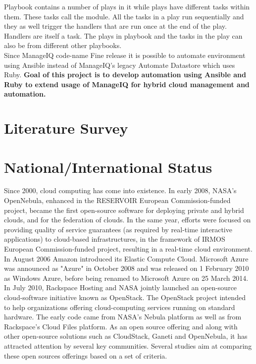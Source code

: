 \documentclass[a4paper,12pt]{report}
\begin{document}
Playbook contains a number of plays in it while plays have different tasks within them. These tasks call the module. All the tasks in a play run sequentially and they as well trigger the handlers that are run once at the end of the play. Handlers are itself a task. The plays in playbook and the tasks in the play can also be from different other playbooks.\\

Since ManageIQ code-name Fine release it is possible to automate environment using Ansible instead of ManageIQ's legacy Automate Datastore which uses Ruby. \textbf{Goal of this project is to develop automation using Ansible and Ruby to extend usage of ManageIQ for hybrid cloud management and automation.}


\chapter{Literature Survey}

\chapter{National/International Status}
Since 2000, cloud computing has come into existence. In early 2008, NASA's OpenNebula, enhanced in the RESERVOIR European Commission-funded project, became the first open-source software for deploying private and hybrid clouds, and for the federation of clouds. In the same year, efforts were focused on providing quality of service guarantees (as required by real-time interactive applications) to cloud-based infrastructures, in the framework of IRMOS European Commission-funded project, resulting in a real-time cloud environment.\\

In August 2006 Amazon introduced its Elastic Compute Cloud. Microsoft Azure was announced as "Azure" in October 2008 and was released on 1 February 2010 as Windows Azure, before being renamed to Microsoft Azure on 25 March 2014.\\

In July 2010, Rackspace Hosting and NASA jointly launched an open-source cloud-software initiative known as OpenStack. The OpenStack project intended to help organizations offering cloud-computing services running on standard hardware. The early code came from NASA's Nebula platform as well as from Rackspace's Cloud Files platform. As an open source offering and along with other open-source solutions such as CloudStack, Ganeti and OpenNebula, it has attracted attention by several key communities. Several studies aim at comparing these open sources offerings based on a set of criteria.\\
\end{document}
